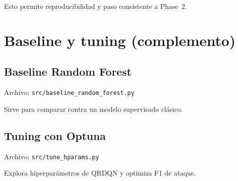 ﻿\documentclass[12pt,a4paper]{article}
\begin{document}
Esto permite reproducibilidad y paso consistente a Phase~2.

\section{Baseline y tuning (complemento)}

\subsection{Baseline Random Forest}

Archivo: \verb|src/baseline_random_forest.py|

Sirve para comparar contra un modelo supervisado clásico.

\subsection{Tuning con Optuna}

Archivo: \verb|src/tune_hparams.py|

Explora hiperparámetros de QRDQN y optimiza F1 de ataque.
\end{document}
